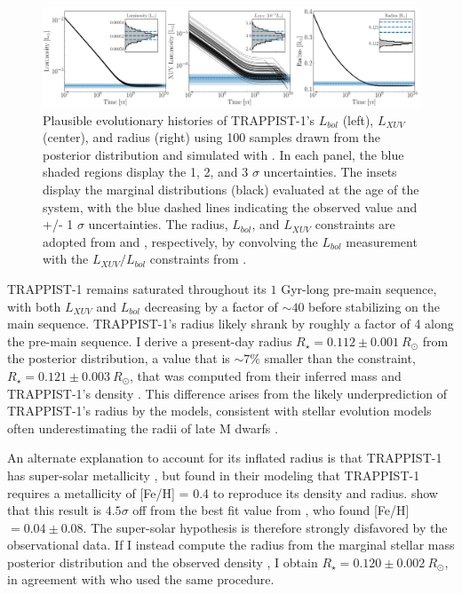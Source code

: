 \begin{figure}
	\includegraphics[width=\textwidth]{trappist1Evol.pdf}
   \caption{Plausible evolutionary histories of TRAPPIST-1's $L_{bol}$ (left), $L_{XUV}$ (center), and radius (right) using 100 samples drawn from the posterior distribution and simulated with \vplanet. In each panel, the blue shaded regions display the 1, 2, and 3 $\sigma$ uncertainties. The insets display the marginal distributions (black) evaluated at the age of the system, with the blue dashed lines indicating the observed value and +/- 1 $\sigma$ uncertainties. The radius, $L_{bol}$, and $L_{XUV}$ constraints are adopted from \citet{vanGrootel2018} and \citet{Wheatley2017}, respectively, by convolving the \citet{vanGrootel2018} $L_{bol}$ measurement with the $L_{XUV}/L_{bol}$ constraints from \citet{Wheatley2017}.}%
    \label{trap:fig:evol}%
\end{figure}

TRAPPIST-1 remains saturated throughout its $1$ Gyr-long pre-main sequence, with both $L_{XUV}$ and $L_{bol}$ decreasing by a factor of ${\sim}40$ before stabilizing on the main sequence. TRAPPIST-1's radius likely shrank by roughly a factor of 4 along the pre-main sequence. I derive a present-day radius $R_{\star} = 0.112 \pm{0.001} \ R_{\odot}$ from the posterior distribution, a value that is ${\sim} 7\%$ smaller than the \citet{vanGrootel2018} constraint, $R_{\star} = 0.121 \pm {0.003} \ R_{\odot}$, that was computed from their inferred mass and TRAPPIST-1's density \citep{Delrez2018}. This difference arises from the likely underprediction of TRAPPIST-1's radius by the \citet{Baraffe2015} models, consistent with stellar evolution models often underestimating the radii of late M dwarfs \citep{Reid2005,Spada2013}. 

An alternate explanation to account for its inflated radius is that TRAPPIST-1 has super-solar metallicity \citep{Burgasser2017,vanGrootel2018}, but \citet{vanGrootel2018} found in their modeling that TRAPPIST-1 requires a metallicity of [Fe/H] = 0.4 to reproduce its density and radius. \citet{vanGrootel2018} show that this result is $4.5\sigma$ off from the best fit value from \citet{Gillon2016}, who found [Fe/H] $= 0.04 \pm{0.08}$. The super-solar hypothesis is therefore strongly disfavored by the observational data. If I instead compute the radius from the marginal stellar mass posterior distribution and the observed density \citep{Delrez2018}, I obtain $R_{\star} = 0.120 \pm{0.002} \ R_{\odot}$, in agreement with \citet{vanGrootel2018} who used the same procedure.

